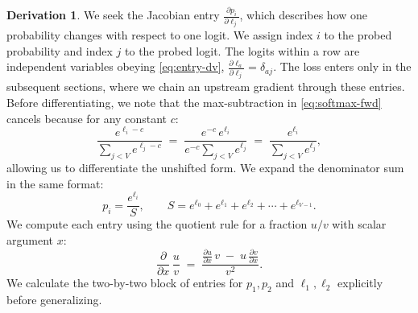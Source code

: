 \documentclass[letterpaper, 10 pt, conference]{ieeeconf}
\newcommand{\pdv}[2]{\frac{\partial #1}{\partial #2}}
\newcommand{\kron}[2]{\delta_{#1 #2}}
\theoremstyle{definition}
\newtheorem*{derivation}{Derivation}
\begin{document}
\begin{derivation}
  We seek the Jacobian entry $\pdv{p_i}{\ell_j}$, which describes how one probability changes with respect to one logit. We assign index $i$ to the probed probability and index $j$ to the probed logit. The logits within a row are independent variables obeying \eqref{eq:entry-dv}, $\pdv{\ell_a}{\ell_j} = \kron{a}{j}$. The loss enters only in the subsequent sections, where we chain an upstream gradient through these entries. Before differentiating, we note that the max-subtraction in \eqref{eq:softmax-fwd} cancels because for any constant $c$:
  \begin{equation}
    \frac{e^{\ell_i - c}}{\sum_{j<V} e^{\ell_j - c}}
    \;=\;
    \frac{e^{-c}\,e^{\ell_i}}{e^{-c}\sum_{j<V} e^{\ell_j}}
    \;=\;
    \frac{e^{\ell_i}}{\sum_{j<V} e^{\ell_j}},
    \label{eq:softmax-shift}
  \end{equation}
  allowing us to differentiate the unshifted form. We expand the denominator sum in the same format:
  \begin{equation}
    p_i = \frac{e^{\ell_i}}{S},
    \qquad
    S = e^{\ell_0} + e^{\ell_1} + e^{\ell_2} + \cdots + e^{\ell_{V-1}}.
    \label{eq:softmax-S}
  \end{equation}
  We compute each entry using the quotient rule for a fraction $u/v$ with scalar argument $x$:
  \begin{equation}
    \pdv{}{x}\,\frac{u}{v}
    \;=\;
    \frac{\pdv{u}{x}\,v \;-\; u\,\pdv{v}{x}}{v^{2}}.
    \label{eq:quotient}
  \end{equation}
  We calculate the two-by-two block of entries for $p_1, p_2$ and $\ell_1, \ell_2$ explicitly before generalizing.


\end{derivation}
\end{document}
